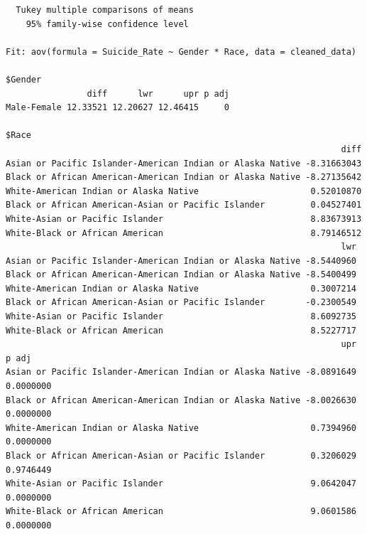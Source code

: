 \documentclass[
  letterpaper,
  DIV=11,
  numbers=noendperiod]{scrartcl}
\begin{document}
\begin{verbatim}
  Tukey multiple comparisons of means
    95% family-wise confidence level

Fit: aov(formula = Suicide_Rate ~ Gender * Race, data = cleaned_data)

$Gender
                diff      lwr      upr p adj
Male-Female 12.33521 12.20627 12.46415     0

$Race
                                                                  diff
Asian or Pacific Islander-American Indian or Alaska Native -8.31663043
Black or African American-American Indian or Alaska Native -8.27135642
White-American Indian or Alaska Native                      0.52010870
Black or African American-Asian or Pacific Islander         0.04527401
White-Asian or Pacific Islander                             8.83673913
White-Black or African American                             8.79146512
                                                                  lwr
Asian or Pacific Islander-American Indian or Alaska Native -8.5440960
Black or African American-American Indian or Alaska Native -8.5400499
White-American Indian or Alaska Native                      0.3007214
Black or African American-Asian or Pacific Islander        -0.2300549
White-Asian or Pacific Islander                             8.6092735
White-Black or African American                             8.5227717
                                                                  upr     p adj
Asian or Pacific Islander-American Indian or Alaska Native -8.0891649 0.0000000
Black or African American-American Indian or Alaska Native -8.0026630 0.0000000
White-American Indian or Alaska Native                      0.7394960 0.0000000
Black or African American-Asian or Pacific Islander         0.3206029 0.9746449
White-Asian or Pacific Islander                             9.0642047 0.0000000
White-Black or African American                             9.0601586 0.0000000


\end{verbatim}
\end{document}

